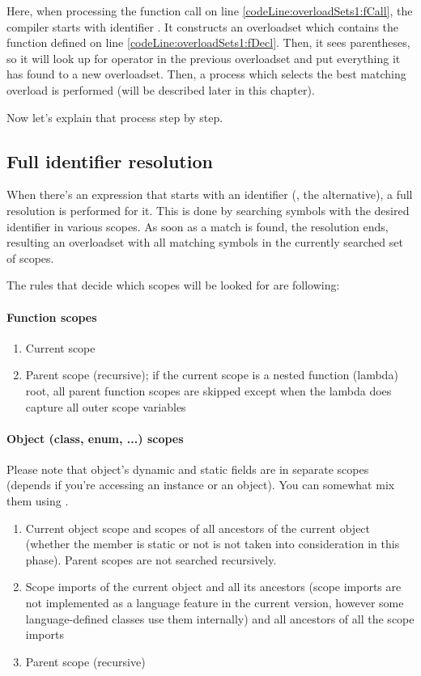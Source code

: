 Here, when processing the function call on line \ref{codeLine:overloadSets1:fCall}, the compiler starts with identifier . It constructs an overloadset which contains the function  defined on line \ref{codeLine:overloadSets1:fDecl}. Then, it sees parentheses, so it will look up for operator  in the previous overloadset and put everything it has found to a new overloadset. Then, a process which selects the best matching overload is performed (will be described later in this chapter).

Now let's explain that process step by step.

\subsection{Full identifier resolution} \label{fullIdentifierResolution}
When there's an expression that starts with an identifier (, the  alternative), a full resolution is performed for it. This is done by searching symbols with the desired identifier in various scopes. As soon as a match is found, the resolution ends, resulting an overloadset with all matching symbols in the currently searched set of scopes.

The rules that decide which scopes will be looked for are following:

\paragraph{Function scopes}
\begin{enumerate}
	\item Current scope
	\item Parent scope (recursive); if the current scope is a nested function (lambda) root, all parent function scopes are skipped except when the lambda does capture all outer scope variables
\end{enumerate}

\paragraph{Object (class, enum, ...) scopes}
Please note that object's dynamic and static fields are in separate scopes (depends if you're accessing an instance or an object). You can somewhat mix them using .

\begin{enumerate}
	\item Current object scope and scopes of all ancestors of the current object (whether the member is static or not is not taken into consideration in this phase). Parent scopes are not searched recursively.
	\item Scope imports of the current object and all its ancestors (scope imports are not implemented as a language feature in the current version, however some language-defined classes use them internally) and all ancestors of all the scope imports
	\item Parent scope (recursive)
\end{enumerate}

